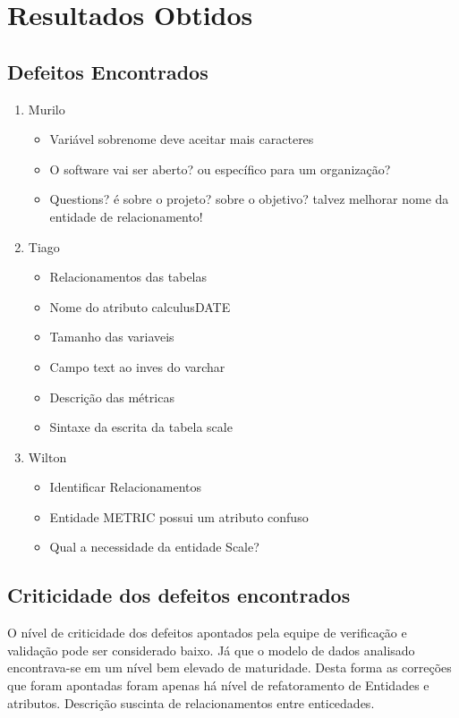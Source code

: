 \chapter[Resultados Obtidos]{Resultados Obtidos}

\section{Defeitos Encontrados}

\begin{enumerate}
  \item Murilo
  \begin{itemize}
    \item Variável sobrenome deve aceitar mais caracteres
    \item O software vai ser aberto? ou específico para um organização?
    \item Questions? é sobre o projeto? sobre o objetivo? talvez melhorar nome da entidade de relacionamento!
  \end{itemize}
  \item Tiago
  \begin{itemize}
    \item Relacionamentos das tabelas
    \item Nome do atributo calculusDATE
    \item Tamanho das variaveis
    \item Campo text ao inves do varchar
    \item Descrição das métricas
    \item Sintaxe da escrita da tabela  scale
  \end{itemize}
  \item Wilton
  \begin{itemize}
    \item Identificar Relacionamentos
    \item Entidade METRIC possui um atributo confuso
    \item Qual a necessidade da entidade Scale?

  \end{itemize}
\end{enumerate}

\section{Criticidade dos defeitos encontrados}

O nível de criticidade dos defeitos apontados pela equipe de verificação e validação pode ser
considerado baixo. Já que o modelo de dados analisado encontrava-se em um nível bem elevado de maturidade.
Desta forma as correções que foram apontadas foram apenas há nível de refatoramento de Entidades e atributos.
Descrição suscinta de relacionamentos entre enticedades.

